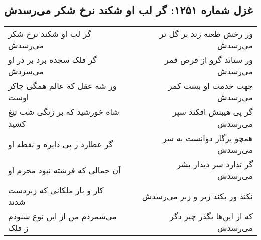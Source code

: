 \begin{center}
\section*{غزل شماره ۱۲۵۱: گر لب او شکند نرخ شکر می‌رسدش}
\label{sec:1251}
\begin{longtable}{l p{0.5cm} r}
گر لب او شکند نرخ شکر می‌رسدش
&&
ور رخش طعنه زند بر گل تر می‌رسدش
\\
گر فلک سجده برد بر در او می‌سزدش
&&
ور ستاند گرو از قرص قمر می‌رسدش
\\
ور شه عقل که عالم همگی چاکر اوست
&&
جهت خدمت او بست کمر می‌رسدش
\\
شاه خورشید که بر زنگی شب تیغ کشید
&&
گر پی هیبتش افکند سپر می‌رسدش
\\
گر عطارد ز پی دایره و نقطه او
&&
همچو پرگار دوانست به سر می‌رسدش
\\
آن جمالی که فرشته نبود محرم او
&&
گر ندارد سر دیدار بشر می‌رسدش
\\
کار و بار ملکانی که زبردست شدند
&&
نکند ور بکند زیر و زبر می‌رسدش
\\
می‌شمردم من از این نوع شنودم ز فلک
&&
که از این‌ها بگذر چیز دگر می‌رسدش
\\
\end{longtable}
\end{center}
